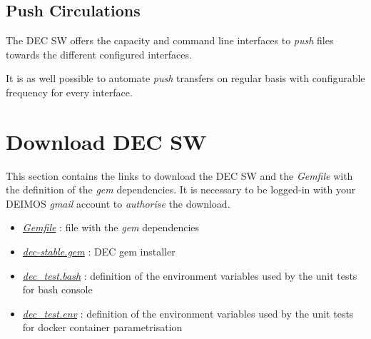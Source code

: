\documentclass[dec_sum_main.tex]{subfiles}
\begin{document}
\subsection{Push Circulations}
The DEC SW offers the capacity and command line interfaces to \textit{push} files towards the different configured interfaces.

It is as well possible to automate \textit{push} transfers on regular basis with configurable frequency for every interface.

\section{Download DEC SW}
This section contains the links to download the DEC SW and the \textit{Gemfile} with the definition of the \textit{gem} dependencies. It is necessary to be logged-in with your DEIMOS \textit{gmail} account to \textit{authorise} the download.

\par
\noindent

\begin{itemize}
	\item \href{https://drive.google.com/uc?export=download&id=18TAD2BAJpHzgBdZGf3W8KQZCY7SPpKbU}{\textit{Gemfile}} : file with the \textit{gem} dependencies 
	\item \href{https://drive.google.com/uc?export=download&id=1gieDRpDEBzKv5Xr0qwPvBz34RHphTnQq}{\textit{dec-stable.gem}} : DEC gem installer
	\item\href{https://drive.google.com/uc?export=download&id=1JBAnxdRwaPK8PmrxuRi3qea43NOPRJbK/view?usp=sharing}{\textit{dec\_test.bash}} : definition of the environment variables used by the unit tests for bash console 
	\item\href{https://drive.google.com/uc?export=download&id=1HHWOVxCZbY6Surv_kKyF5kGTy45CvUKl/view?usp=sharing}{\textit{dec\_test.env}} : definition of the environment variables used by the unit tests for docker container parametrisation
\end{itemize}
\end{document}
